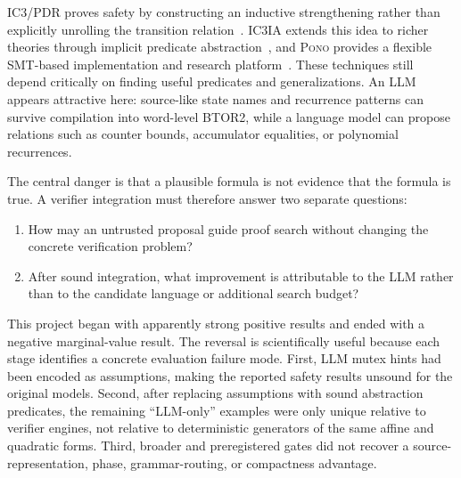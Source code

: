 \documentclass[10pt]{article}
\newcommand{\pono}{\textsc{Pono}}
\newcommand{\icthreeia}{\textsc{IC3IA}}
\newcommand{\btor}{\textsc{BTOR2}}
\begin{document}
IC3/PDR proves safety by constructing an inductive strengthening rather than
explicitly unrolling the transition relation~\cite{Bradley2011IC3}.
\icthreeia{} extends this idea to richer theories through implicit predicate
abstraction~\cite{Cimatti2014IC3IA}, and \pono{} provides a flexible
SMT-based implementation and research platform~\cite{Mann2021Pono}.  These
techniques still depend critically on finding useful predicates and
generalizations.  An LLM appears attractive here: source-like state names and
recurrence patterns can survive compilation into word-level \btor{}, while a
language model can propose relations such as counter bounds, accumulator
equalities, or polynomial recurrences.

The central danger is that a plausible formula is not evidence that the
formula is true.  A verifier integration must therefore answer two separate
questions:
\begin{enumerate}
  \item How may an untrusted proposal guide proof search without changing the
        concrete verification problem?
  \item After sound integration, what improvement is attributable to the LLM
        rather than to the candidate language or additional search budget?
\end{enumerate}

This project began with apparently strong positive results and ended with a
negative marginal-value result.  The reversal is scientifically useful because
each stage identifies a concrete evaluation failure mode.  First, LLM mutex
hints had been encoded as assumptions, making the reported safety results
unsound for the original models.  Second, after replacing assumptions with
sound abstraction predicates, the remaining ``LLM-only'' examples were only
unique relative to verifier engines, not relative to deterministic generators
of the same affine and quadratic forms.  Third, broader and preregistered gates
did not recover a source-representation, phase, grammar-routing, or compactness
advantage.
\end{document}
